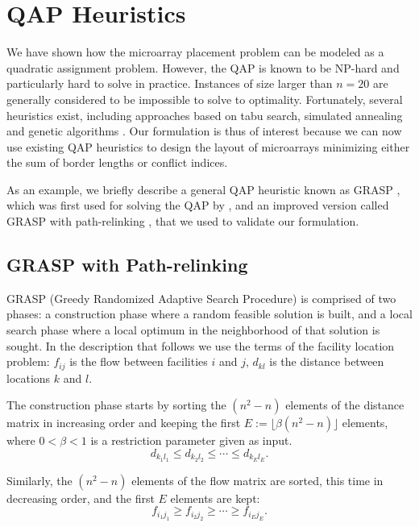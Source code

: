 \section{QAP Heuristics}
\label{sec:qap_heuristics}

We have shown how the microarray placement problem can be modeled as a
quadratic assignment problem. However, the QAP is known to be NP-hard and
particularly hard to solve in practice. Instances of size larger than
$n = 20$ are generally considered to be impossible to solve to
optimality. Fortunately, several heuristics exist, including approaches based on
tabu search, simulated annealing and genetic algorithms
\citep[for a survey, see][]{Cela1997}. Our formulation is thus of interest
because we can now use existing QAP heuristics to design the layout of
microarrays minimizing either the sum of border lengths or conflict indices.

As an example, we briefly describe a general QAP heuristic known as GRASP \citep
{Li1994}, which was first used for solving the QAP by \citet{Feo1995}, and an
improved version called GRASP with path-relinking \citep{Oliveira2004}, that we
used to validate our formulation.

\subsection{GRASP with Path-relinking}
\label{sec:qap_grasp}

GRASP (Greedy Randomized Adaptive Search Procedure) is comprised of two phases:
a construction phase where a random feasible solution is built, and a local
search phase where a local optimum in the neighborhood of that solution is
sought. In the description that follows we use the terms of the facility
location problem: $f_{ij}$ is the flow between facilities $i$ and $j$, $d_{kl}$
is the distance between locations $k$ and $l$.

The construction phase starts by sorting the $(n^2 - n)$ elements of the
distance matrix in increasing order and keeping the first
$E:= \lfloor \beta (n^2 - n) \rfloor$ elements, where $0 < \beta < 1$ is a
restriction parameter given as input.
\begin{displaymath}
d_{k_1 l_1} \le d_{k_2 l_2} \le \cdots \le d_{k_E l_E}.
\end{displaymath}

Similarly, the $(n^2 - n)$ elements of the flow matrix are sorted, this time in
decreasing order, and the first $E$ elements are kept:
\begin{displaymath}
f_{i_1 j_1} \ge f_{i_2 j_2} \ge \cdots \ge f_{i_E j_E}.
\end{displaymath}

